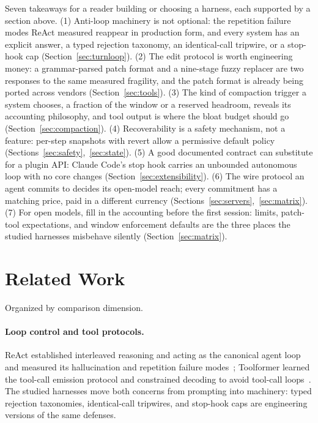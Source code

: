 \documentclass{article}
\newcommand{\ccc}[0]{Claude Code}
\begin{document}
Seven takeaways for a reader building or choosing a harness, each
supported by a section above. (1) Anti-loop machinery is not optional:
the repetition failure modes ReAct measured reappear in production form,
and every system has an explicit answer, a typed rejection taxonomy, an
identical-call tripwire, or a stop-hook cap
(Section~\ref{sec:turnloop}). (2) The edit protocol is worth engineering
money: a grammar-parsed patch format and a nine-stage fuzzy replacer are
two responses to the same measured fragility, and the patch format is
already being ported across vendors (Section~\ref{sec:tools}).
(3) The kind of compaction trigger a system chooses, a fraction of the
window or a reserved headroom, reveals its accounting philosophy, and
tool output is where the bloat budget should go
(Section~\ref{sec:compaction}). (4) Recoverability is a safety
mechanism, not a feature: per-step snapshots with revert allow a
permissive default policy (Sections~\ref{sec:safety},~\ref{sec:state}).
(5) A good documented contract can substitute for a plugin API: \ccc{}'s
stop hook carries an unbounded autonomous loop with no core changes
(Section~\ref{sec:extensibility}). (6) The wire protocol an agent commits
to decides its open-model reach; every commitment has a matching price,
paid in a different currency (Sections~\ref{sec:servers},~\ref{sec:matrix}).
(7) For open models, fill in the accounting before the first session:
limits, patch-tool expectations, and window enforcement defaults are the
three places the studied harnesses misbehave silently
(Section~\ref{sec:matrix}).

\section{Related Work}
\label{sec:related}

Organized by comparison dimension.

\paragraph{Loop control and tool protocols.} ReAct established interleaved
reasoning and acting as the canonical agent loop and measured its
hallucination and repetition failure modes~\citep{yao2023react}; Toolformer
learned the tool-call emission protocol and constrained decoding to avoid
tool-call loops~\citep{schick2023toolformer}. The studied harnesses move
both concerns from prompting into machinery: typed rejection taxonomies,
identical-call tripwires, and stop-hook caps are engineering versions of
the same defenses.
\end{document}
